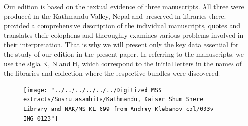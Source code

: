 Our edition is based on the textual evidence of three manuscripts.  All three were produced 
in the Kathmandu Valley, Nepal and preserved in libraries there. 
\textcites[\S 
2.1]{kleb-2021b} provided a comprehensive description of the individual manuscripts, quotes 
and translates their colophons and thoroughly examines various problems involved in their 
interpretation. That is why we will present only the key data essential for the study of our 
edition in the present paper.
In referring to the manuscripts, we use the sigla K, N and H, which correspond to the initial letters in the names of the libraries and collection where the respective bundles were discovered.

\begin{description}
    \begin{figure}[t]
        \centering
        \texttt{[image: "../../../../../../Digitized MSS 
        extracts/Susrutasamhita/Kathmandu, Kaiser Shum Shere Library and NAK/MS KL 699 
        from Andrey Klebanov col/003v IMG\_0123"]}
        \caption{}
        \label{fig:003v-img0123}
    \end{figure}
    

\end{description}

